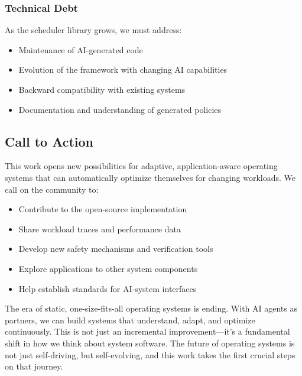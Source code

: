 \subsubsection{Technical Debt}
As the scheduler library grows, we must address:
\begin{itemize}
\item Maintenance of AI-generated code
\item Evolution of the framework with changing AI capabilities
\item Backward compatibility with existing systems
\item Documentation and understanding of generated policies
\end{itemize}

\subsection{Call to Action}

This work opens new possibilities for adaptive, application-aware operating systems that can automatically optimize themselves for changing workloads. We call on the community to:

\begin{itemize}
\item Contribute to the open-source implementation
\item Share workload traces and performance data
\item Develop new safety mechanisms and verification tools
\item Explore applications to other system components
\item Help establish standards for AI-system interfaces
\end{itemize}

The era of static, one-size-fits-all operating systems is ending. With AI agents as partners, we can build systems that understand, adapt, and optimize continuously. This is not just an incremental improvement—it's a fundamental shift in how we think about system software. The future of operating systems is not just self-driving, but self-evolving, and this work takes the first crucial steps on that journey.
